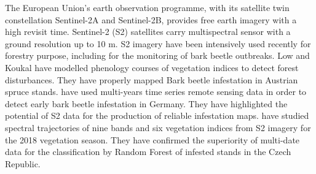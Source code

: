 \documentclass[3p,procedia]{elsarticle}
\begin{document}
The European Union’s earth observation programme, with its satellite twin constellation Sentinel-2A and Sentinel-2B, provides free earth imagery with a high revisit time. 
Sentinel-2 (S2) satellites carry multispectral sensor with a ground resolution up to 10 m. 
S2 imagery have been intensively used recently for forestry purpose, including for the monitoring of bark beetle outbreaks. 
Low and Koukal \citep{low_phenology_2020} have modelled phenology courses of vegetation indices to detect forest disturbances. 
They have properly mapped Bark beetle infestation in Austrian spruce stands.
\cite{ali_canopy_2021} have used multi-years time series remote sensing data in order to detect early bark beetle infestation in Germany. 
They have highlighted the potential of S2 data for the production of reliable infestation maps.
\cite{barta_early_2021} have studied spectral trajectories of nine bands and six vegetation indices from S2 imagery for the 2018 vegetation season. 
They have confirmed the superiority of multi-date data for the classification by Random Forest of infested stands in the Czech Republic.
\end{document}
